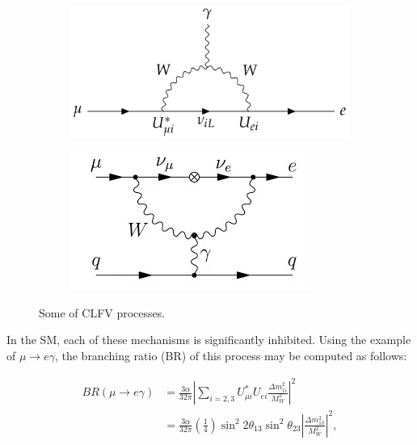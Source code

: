 \begin{figure}[!h]
     \begin{subfigure}[b]{0.4\linewidth}
         \centering
         \includegraphics[scale = 0.2]{figures/png/Screenshot_20240217_171058.png}
         \label{fig:mutoegamma}
     \end{subfigure}
     \begin{subfigure}[b]{0.7\linewidth}
         \centering
         \includegraphics[scale = 0.5]{figures/jpg/1_erkKoywyuFzJmMv4PKpc9Q.jpg}
         \label{fig:mutoeN}
     \end{subfigure}
     \caption{Some of CLFV processes.}
        \label{fig:three graphs2}
\end{figure}
In the SM, each of these mechanisms is significantly inhibited. Using the example of $\mu \rightarrow  e \gamma $, the branching ratio (BR) of this process may be computed as follows:

\begin{equation}
\begin{aligned}
B R(\mu \rightarrow e \gamma) & =\frac{3 \alpha}{32 \pi}\left|\sum_{i=2,3} U_{\mu i}^* U_{e i} \frac{\Delta m_{1 i}^2}{M_W^2}\right|^2 \\
& =\frac{3 \alpha}{32 \pi}\left(\frac{1}{4}\right) \sin ^2 2 \theta_{13} \sin ^2 \theta_{23}\left|\frac{\Delta m_{13}^2}{M_W^2}\right|^2,
\end{aligned}
\end{equation}

